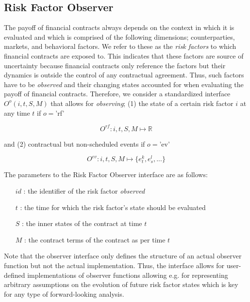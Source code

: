 \documentclass[9pt,oneside]{amsart}
\newcommand{\Real}{\mathbb{R}}
\newcommand{\obsfull}[5]{O^{#1}(#2,#3,#4,#5)}
\newcommand{\obsfunc}[1]{O^{#1}}
\begin{document}
\begin{multicols}{2}



\section{Risk Factor Observer}\label{rfmodel}

The payoff of financial contracts always depends on the context in which it is evaluated and which is comprised of the following dimensions; counterparties, markets, and behavioral factors. We refer to these as the \textit{risk factors} to which financial contracts are exposed to. This indicates that these factors are source of uncertainty because financial contracts only reference the factors but their dynamics is outside the control of any contractual agreement. Thus, such factors have to be \textit{observed} and their changing states accounted for when evaluating the payoff of financial contracts. Therefore, we consider a standardized interface $\obsfull{o}{i}{t}{S}{M}$ that allows for \textit{observing}; (1) the state of a certain risk factor $i$ at any time $t$ if $o=$'rf'

\[
	\obsfunc{rf}: i,t,S,M \mapsto \Real
\]

and (2) contractual but non-scheduled events if $o=$'ev'

\[
	\obsfunc{ev}: i,t,S,M \mapsto \{e_t^{k},e_s^{l},...\}
\]

The parameters to the Risk Factor Observer interface are as follows:

\begin{itemize}
	\item[$id$]: the identifier of the risk factor \textit{observed}

	\item[$t$]: the time for which the risk factor’s state should be evaluated

	\item [$S$]: the inner states of the contract at time $t$

	\item [$M$]: the contract terms of the contract as per time $t$
\end{itemize}

Note that the observer interface only defines the structure of an actual observer function but not the actual implementation. Thus, the interface allows for user-defined implementations of observer functions allowing e.g. for representing arbitrary assumptions on the evolution of future risk factor states which is key for any type of forward-looking analysis.


\end{multicols}
\end{document}
